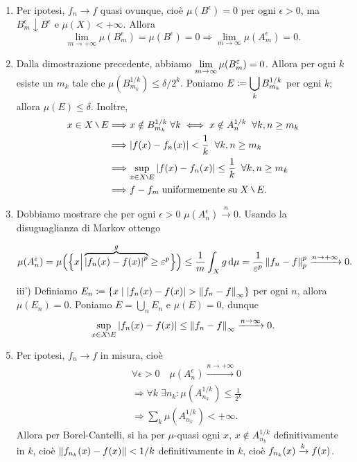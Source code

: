 \begin{enumerate}
\item Per ipotesi, $f_n \to f$ quasi ovunque, cioè $\mu(B^\epsilon) = 0$ per ogni $\epsilon > 0$, ma $B_m^\epsilon \downarrow B^\epsilon$ e $\mu(X) < +\infty$.
Allora
%
$$
\lim_{m \to +\infty} \mu(B_m^\epsilon) = \mu(B^\epsilon) = 0 \Longrightarrow \lim_{m \to \infty} \mu(A_m^\epsilon) = 0.
$$
%

\item Dalla dimostrazione precedente, abbiamo $\displaystyle \lim_{m \to \infty} \mu(B_m^\varepsilon) = 0$. 
Allora per ogni $k$ esiste un $m_k$ tale che $\mu \left( B_{m_k}^{1/k} \right) \leq \delta / 2^k$.
Poniamo $\displaystyle E \coloneqq  \bigcup_{k} B_{m_k}^{1/k}$ per ogni $k$; allora $\mu(E) \leq \delta$.
Inoltre,
\begin{align*}
x \in X \setminus E & \Longrightarrow x \notin B_{m_k}^{1/k} \; \forall k \iff x \notin A_n^{1/k} \mquad \forall k,n \geq m_ k \\
& \Longrightarrow \left| f(x) - f_n(x) \right| < \frac{1}{k} \mquad \forall k,n \geq m_k \\
& \Longrightarrow \sup_{x \in X \setminus E} \left| f(x) - f_n(x) \right| \leq \frac{1}{k} \mquad \forall k,n \geq m_k \\
& \Longrightarrow f - f_m \; \text{uniformemente su} \; X \setminus E.
\end{align*}

\item Dobbiamo mostrare che per ogni $\epsilon > 0$ $\mu(A_n^\epsilon) \xrightarrow{n} 0$.
Usando la disuguaglianza di Markov ottengo

%
$$
\mu(A_n^\varepsilon) 
= \mu \Big( \Big\{ x \Big| \overbrace{\left| f_n(x) - f(x) \right|^p}^{g} \geq \varepsilon^p \Big\} \Big)
\leq \frac{1}{m} \int_{X}^{} g \,\mathrm{d} \mu = \frac{1}{\varepsilon^p} \left\lVert f_n - f \right\rVert_p^p \xrightarrow{n \to +\infty} 0.
$$
%

\item[iii')] Definiamo $\displaystyle E_n \coloneqq  \left\{ x \;\middle|\; \left| f_n(x) - f(x) \right| > \left\lVert f_n - f \right\rVert_\infty \right\}$ per ogni $n$, allora $\mu(E_n) = 0$.
Poniamo $E = \bigcup_{n} E_n$ e $\mu(E) = 0$, dunque
%
$$
\sup_{x \in X\setminus E} \left| f_n(x) - f(x) \right| \leq \norm{f_n - f}_\infty \xrightarrow{n \to \infty} 0.
$$
%


\item Per ipotesi, $f_n \to f$ in misura, cioè
\begin{align*}
& \forall \epsilon > 0 \quad \mu \left( A_n^\epsilon \right) \xrightarrow{n \to +\infty} 0 \\
& \Longrightarrow \forall k \; \exists n_k \colon \mu \left( A_{n_k}^{1/k} \right) \leq \frac{1}{2^k} \\
& \Longrightarrow \sum_{k}^{} \mu \left( A_{n_k}^{1/k} \right) < +\infty. 
\end{align*}
Allora per Borel-Cantelli, si ha per $\mu$-quasi ogni $x$, $x \notin A_{n_k}^{1/k}$ definitivamente in $k$, cioè $\left\lVert f_{n_k}(x) - f(x) \right\rVert < 1/k$ definitivamente in $k$, cioè $\displaystyle f_{n_k}(x) \xrightarrow{k} f(x)$.


\end{enumerate}

